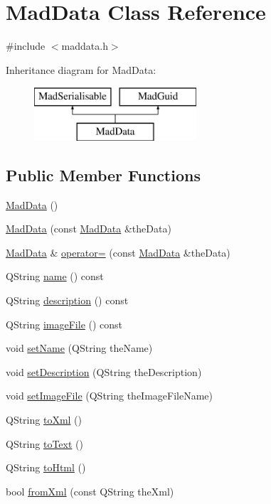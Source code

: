 \hypertarget{class_mad_data}{\section{Mad\-Data Class Reference}
\label{class_mad_data}
}


{\ttfamily \#include $<$maddata.\-h$>$}

Inheritance diagram for Mad\-Data\-:\begin{figure}[H]
\begin{center}
\leavevmode
\includegraphics[height=2.000000cm]{class_mad_data}
\end{center}
\end{figure}
\subsection*{Public Member Functions}
\begin{DoxyCompactItemize}
\item 
\hyperlink{class_mad_data_a2a1f2ab4197fdfcb39dd148ad275799c}{Mad\-Data} ()
\item 
\hyperlink{class_mad_data_ad0204b1c96f0f75748e4c4c631375ce5}{Mad\-Data} (const \hyperlink{class_mad_data}{Mad\-Data} \&the\-Data)
\item 
\hyperlink{class_mad_data}{Mad\-Data} \& \hyperlink{class_mad_data_a694a4390c70108c9c55cea910dc29225}{operator=} (const \hyperlink{class_mad_data}{Mad\-Data} \&the\-Data)
\item 
Q\-String \hyperlink{class_mad_data_a83d295ac76b82edd24831a9800e275f6}{name} () const 
\item 
Q\-String \hyperlink{class_mad_data_aaf9c28a2ee3363dd2766adbbee12a890}{description} () const 
\item 
Q\-String \hyperlink{class_mad_data_a5acf4019906ad50fd96a1815b08ac11a}{image\-File} () const 
\item 
void \hyperlink{class_mad_data_af9c155374899f439660bade71c095116}{set\-Name} (Q\-String the\-Name)
\item 
void \hyperlink{class_mad_data_ac6aabfd092e0a2ce00a2f326e875946a}{set\-Description} (Q\-String the\-Description)
\item 
void \hyperlink{class_mad_data_a649da13149edf70c2a9b6273b556bd7b}{set\-Image\-File} (Q\-String the\-Image\-File\-Name)
\item 
Q\-String \hyperlink{class_mad_data_a73665b8eef0518c8c9b2df7d7565f5f8}{to\-Xml} ()
\item 
Q\-String \hyperlink{class_mad_data_a45a072ec3fee653ea15db10ab4d11156}{to\-Text} ()
\item 
Q\-String \hyperlink{class_mad_data_a985880da3130aa406964e9e8db4f0cee}{to\-Html} ()
\item 
bool \hyperlink{class_mad_data_a30677cb8685255a7939d401121525fb6}{from\-Xml} (const Q\-String the\-Xml)
\end{DoxyCompactItemize}


